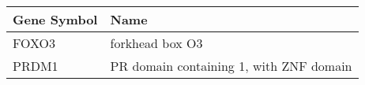 \begin{tabular}{ll}
\toprule
Gene Symbol &                                    Name \\
\midrule
      FOXO3 &                         forkhead box O3 \\
      PRDM1 & PR domain containing 1, with ZNF domain \\
\bottomrule
\end{tabular}
